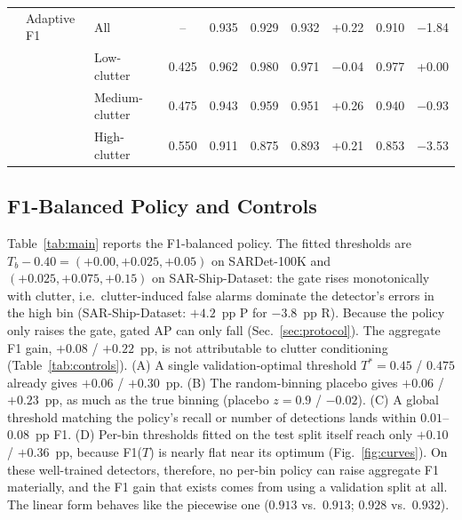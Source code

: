 \documentclass[journal]{IEEEtran}
\providecommand{\linelabel}[1]{}
\begin{document}
\begin{table}[t]
\begin{tabular}{l l l c c c c r c r}
\addlinespace[2pt]
            & Adaptive F1           & All            &    -- & 0.935 & 0.929 & 0.932 &   +0.22 & 0.910 & $-$1.84 \\
            &                       & Low-clutter    & 0.425 & 0.962 & 0.980 & 0.971 & $-$0.04 & 0.977 &   +0.00 \\
            &                       & Medium-clutter & 0.475 & 0.943 & 0.959 & 0.951 &   +0.26 & 0.940 & $-$0.93 \\
            &                       & High-clutter   & 0.550 & 0.911 & 0.875 & 0.893 &   +0.21 & 0.853 & $-$3.53 \\
\bottomrule
\end{tabular}
\end{table}

\subsection{F1-Balanced Policy and Controls}
\label{sec:controls}
\linelabel{ln:ctrl}Table~\ref{tab:main} reports the F1-balanced policy. The fitted
thresholds are $T_b-0.40=(+0.00,+0.025,+0.05)$ on SARDet-100K and
$(+0.025,+0.075,+0.15)$ on SAR-Ship-Dataset\linelabel{ln:hi}: the gate rises
monotonically with clutter, i.e.\ clutter-induced false alarms dominate
the detector's errors in the high bin (SAR-Ship-Dataset: $+4.2$~pp P for
$-3.8$~pp R).\linelabel{ln:hiend} Because the policy only raises the gate, gated AP can only
fall (Sec.~\ref{sec:protocol}). The aggregate F1 gain, $+0.08$ /
$+0.22$~pp, is not attributable to clutter conditioning
(Table~\ref{tab:controls}). \linelabel{ln:ctrlA}(A) A single validation-optimal threshold
$T^{*}{=}0.45$ / $0.475$ already gives $+0.06$ / $+0.30$~pp. (B) The
random-binning placebo gives $+0.06$ / $+0.23$~pp, as much as the true
binning (placebo $z{=}0.9$ / $-0.02$). (C) A global threshold matching the
policy's recall or number of detections lands within $0.01$--$0.08$~pp F1.
(D) Per-bin thresholds fitted on the test split itself reach only
$+0.10$ / $+0.36$~pp, because F1($T$) is nearly flat near its optimum
(Fig.~\ref{fig:curves}). On these well-trained detectors, therefore, no
per-bin policy can raise aggregate F1 materially, and the F1 gain that
exists comes from using a validation split at all. The linear form
behaves like the piecewise one ($0.913$ vs.\ $0.913$; $0.928$ vs.\
$0.932$).\linelabel{ln:ctrlend}
\end{document}
